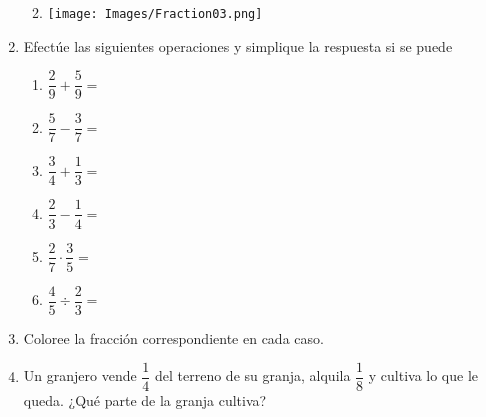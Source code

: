 \documentclass[fleqn]{article}
\begin{document}
\begin{enumerate}
\begin{enumerate}
\begin{multicols}{2}
\end{multicols}
\item \texttt{[image: Images/Fraction03.png]}
\end{enumerate}
\newpage
\item Efectúe las siguientes operaciones y simplique la respuesta si se puede
\begin{enumerate}
\item $\dfrac{2}{9}+\dfrac{5}{9}=$\noanswer[15pt]
\item $\dfrac{5}{7}-\dfrac{3}{7}=$\noanswer[15pt]
\item $\dfrac{3}{4}+\dfrac{1}{3}=$\noanswer[15pt]
\item $\dfrac{2}{3}-\dfrac{1}{4}=$\noanswer[15pt]
\item $\dfrac{2}{7}\cdot \dfrac{3}{5}=$\noanswer[15pt]
\item $\dfrac{4}{5}\div \dfrac{2}{3}=$\noanswer[15pt]
\end{enumerate}
\item Coloree la fracción correspondiente en cada caso.
\begin{enumerate}
 \end{enumerate}
 \item Un granjero vende $\dfrac{1}{4}$ del terreno de su granja, alquila  $\dfrac{1}{8}$ y cultiva lo que le queda. ¿Qué parte de la granja cultiva?
 \end{enumerate}
\end{document}
